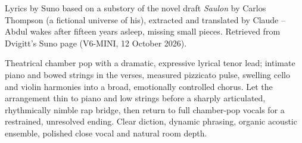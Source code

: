 
\begin{notes}
Lyrics by Suno based on a substory of the novel draft \emph{Saulon} by Carlos Thompson (a fictional universe of his), extracted and translated by Claude -- Abdul wakes after fifteen years asleep, missing small pieces. Retrieved from Dvigitt's Suno page (V6-MINI, 12 October 2026).
\end{notes}
\begin{style}
Theatrical chamber pop with a dramatic, expressive lyrical tenor lead; intimate piano and bowed strings in the verses, measured pizzicato pulse, swelling cello and violin harmonies into a broad, emotionally controlled chorus. Let the arrangement thin to piano and low strings before a sharply articulated, rhythmically nimble rap bridge, then return to full chamber-pop vocals for a restrained, unresolved ending. Clear diction, dynamic phrasing, organic acoustic ensemble, polished close vocal and natural room depth.
\end{style}
